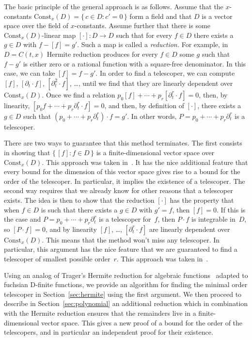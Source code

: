\documentclass{sig-alternate}
\begin{document}
The basic principle of the general approach is as follows. Assume that the
$x$-constants $\mathrm{Const}_x(D)=\{\,c\in D:c'=0\,\}$ form a field and that $D$
is a vector space over the field of $x$-constants. Assume further that there is
some $\mathrm{Const}_x(D)$-linear map $[\cdot]\colon D\to D$ such that for every
$f\in D$ there exists a $g\in D$ with $f-[f]=g'$. Such a map is called a
\emph{reduction.} For example, in $D=C(t,x)$ Hermite reduction produces for
every $f\in D$ some $g$ such that $f-g'$ is either zero or a rational function
with a square-free denominator. In this case, we can take $[f]=f-g'$.
In order to find a telescoper, we can compute $[f]$, $[\partial_t\cdot f]$, $[\partial_t^2\cdot f]$, \dots,
until we find that they are linearly dependent over $\mathrm{Const}_x(D)$.
Once we find a relation
$p_0[f] + \cdots + p_r[\partial_t^r\cdot f] = 0$,
then, by linearity,
$[p_0 f + \cdots + p_r \partial_t^r\cdot f] = 0$,
and then, by definition of $[\cdot]$, there exists a $g\in D$ such that $(p_0+\cdots + p_r\partial_t^r)\cdot f=g'$.
In other words, $P=p_0+\cdots + p_r\partial_t^r$ is a telescoper.

There are two ways to guarantee that this method terminates. The first consists in
showing that $\{\,[f]:f\in D\,\}$ is a finite-dimensional vector space over
$\mathrm{Const}_x(D)$. This approach was taken in~\cite{BCCL2010,bostan13a}. It has the
nice additional feature that every bound for the dimension of this vector space
gives rise to a bound for the order of the telescoper. In particular, it implies
the existence of a telescoper. The second way requires that we already know for
other reasons that a telescoper exists. The idea is then to show that the
reduction $[\cdot]$ has the property that when $f\in D$ is such that there
exists a $g\in D$ with $g'=f$, then $[f]=0$. If this is the case and
$P=p_0+\cdots+p_r\partial_t^r$ is a telescoper for~$f$, then $P\cdot f$ is integrable
in~$D$, so $[P\cdot f]=0$, and by linearity $[f]$, \dots, $[\partial_t^r\cdot f]$ are
linearly dependent over $\mathrm{Const}_x(D)$. This means that the method won't
miss any telescoper. In particular, this argument has the nice feature that we
are guaranteed to find a telescoper of smallest possible order~$r$. This
approach was taken in~\cite{chen15a}.

Using an analog of Trager's Hermite reduction for algebraic
functions~\cite{trager84,geddes92}  adapted to fuchsian D-finite functions, we provide an
algorithm for finding the minimal order telescoper in Section~\ref{sec:hermite} using the
first argument. We then proceed to describe in Section~\ref{sec:polynomial} an additional
reduction which in combination with the Hermite reduction ensures that the
remainders live in a finite-dimensional vector space.
This gives a new proof of a bound for the order of the telescopers,
and in particular an independent proof for their existence.
\end{document}
